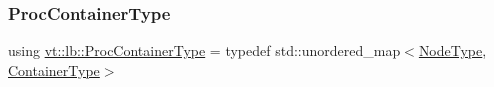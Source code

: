 \subsubsection{\texorpdfstring{Proc\+Container\+Type}{ProcContainerType}}
{\footnotesize\ttfamily using \hyperlink{namespacevt_1_1lb_af7c6ee21a7b3966b7ab64c5b626d30f8}{vt\+::lb\+::\+Proc\+Container\+Type} = typedef std\+::unordered\+\_\+map$<$\hyperlink{namespacevt_a866da9d0efc19c0a1ce79e9e492f47e2}{Node\+Type}, \hyperlink{namespacevt_1_1lb_aaed3aa01cc192561401ff2c611b4252f}{Container\+Type}$>$}

